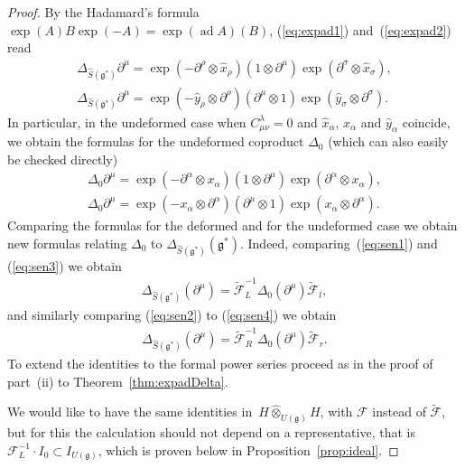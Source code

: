 \documentclass[pdftex]{sigma}
\def\gg{\mathfrak{g}}
\def\hx{\hat{x}}
\def\hy{\hat{y}}
\def\ad{\operatorname{ad}}
\numberwithin{equation}{section}
\begin{document}
\begin{proof}
By the Hadamard's formula $\exp(A)B\exp(-A) = \exp(\ad A)(B)$, (\ref{eq:expad1}) and~(\ref{eq:expad2}) read
\begin{gather}\label{eq:sen1}
\Delta_{\hat{S}(\gg^*)}\partial^\mu = \exp(-\partial^\rho \otimes\hx_\rho)(1\otimes\partial^\mu)\exp(\partial^\sigma\otimes\hx_\sigma),\\
\label{eq:sen2}
\Delta_{\hat{S}(\gg^*)}\partial^\mu = \exp(-\hy_\rho\otimes\partial^\rho)(\partial^\mu\otimes 1)\exp(\hy_\sigma\otimes\partial^\sigma).
\end{gather}
In particular, in the undeformed case when $C_{\mu\nu}^\lambda = 0$ and $\hx_\alpha$, $x_\alpha$ and $\hy_\alpha$ coincide, we obtain the formulas for the undeformed coproduct $\Delta_0$ (which can also easily be checked directly)
\begin{gather}\label{eq:sen3}
\Delta_0\partial^\mu = \exp(-\partial^\alpha\otimes x_\alpha)(1\otimes\partial^\mu)\exp(\partial^\alpha\otimes x_\alpha),\\
\label{eq:sen4}
\Delta_0\partial^\mu = \exp(-x_\alpha\otimes\partial^\alpha)
(\partial^\mu\otimes 1)\exp(x_\alpha\otimes\partial^\alpha).
\end{gather}
Comparing the formulas for the deformed and for the undeformed case we obtain new formulas relating $\Delta_0$ to $\Delta_{\hat{S}(\gg^*)}(\gg^*)$. Indeed, comparing~(\ref{eq:sen1}) and (\ref{eq:sen3}) we obtain
\begin{gather*}%
\Delta_{\hat{S}(\gg^*)}(\partial^\mu) = \tilde{\mathcal{F}}^{-1}_L\Delta_0(\partial^\mu)\tilde{\mathcal{F}}_l,
\end{gather*}
and similarly comparing (\ref{eq:sen2}) to (\ref{eq:sen4}) we obtain
\begin{gather*}%
\Delta_{\hat{S}(\gg^*)}(\partial^\mu) = \tilde{\mathcal{F}}^{-1}_R\Delta_0(\partial^\mu)\tilde{\mathcal{F}}_r.
\end{gather*}
To extend the identities to the formal power series proceed as in the proof of part~(ii) to Theorem~\ref{thm:expadDelta}.

We would like to have the same identities in~$H\hat\otimes_{U(\gg)}H$, with $\mathcal{F}$ instead of $\tilde{\mathcal{F}}$, but for this the calculation should not depend on a representative, that is $\mathcal{F}^{-1}_L\cdot I_0 \subset I_{U(\gg)}$, which is proven below in Proposition~\ref{prop:ideal}.
\end{proof}
\end{document}
